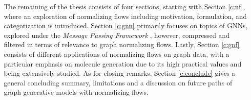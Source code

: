 The remaining of the thesis consists of four sections, starting with Section
\ref{c:nf}, where an exploration of normalizing flows including motivation,
formulation, and categorization is introduced. Section \ref{c:gnn} primarily
focuses on topics of GNNs, explored under the \textit{Message Passing Framework}
\citep{gilmerNeuralMessagePassing2017}, however, compressed and filtered in
terms of relevance to graph normalizing flows. Lastly, Section \ref{c:gnf}
consists of different applications of normalizing flows on graph data, with a
particular emphasis on molecule generation due to its high practical values and
being extensively studied. As for closing remarks, Section \ref{c:conclude}
gives a general concluding summary, limitations and a discussion on future paths
of graph generative models with normalizing flows.

